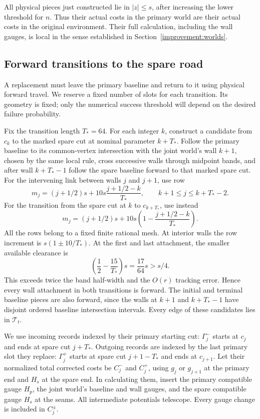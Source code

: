 All physical pieces just constructed lie in $|z|\leq s$, after
increasing the lower threshold for $n$. Thus their actual costs in
the primary world are their actual costs in the original environment.
Their full calculation, including the wall gauges, is local in the
sense established in Section~\ref{improvement:worlds}.

\subsection{Forward transitions to the spare road}
\label{improvement:transitions}

A replacement must leave the primary baseline and return to it using
physical forward travel. We reserve a fixed number of slots for each
transition. Its geometry is fixed; only the numerical success threshold
will depend on the desired failure probability.

Fix the transition length $T_*=64$. For each
integer $k$, construct a candidate from $c_k$ to the marked spare
cut at nominal parameter $k+T_*$. Follow the primary baseline to its
common-vertex intersection with the joint world's wall $k+1$, chosen
by the same local rule, cross successive
walls through midpoint bands, and after wall $k+T_*-1$ follow the
spare baseline forward to that marked spare cut. For the intervening
link between walls $j$ and $j+1$, use row
\begin{equation}
 m_j=(j+1/2)s+10s\frac{j+1/2-k}{T_*},
 \qquad k+1\leq j\leq k+T_*-2.
 \label{improvement:transitions:eq1}
\end{equation}
For the transition from the spare cut at $k$ to $c_{k+T_*}$, use instead
\begin{equation}
 m_j=(j+1/2)s+10s\left(1-\frac{j+1/2-k}{T_*}\right).
 \label{improvement:transitions:eq2}
\end{equation}
All the rows belong to a fixed finite rational mesh. At interior walls
the row increment is $s(1\pm10/T_*)$. At the first and last attachment,
the smaller available clearance is
\[
 \left(\frac12-\frac{15}{T_*}\right)s
 =\frac{17}{64}s>s/4.
\]
This exceeds twice the band half-width and the $O(r)$ tracking error.
Hence every wall attachment in both transitions is forward. The
initial and terminal baseline pieces are also forward, since the
walls at $k+1$ and $k+T_*-1$ have disjoint ordered baseline intersection
intervals. Every edge of these candidates lies in $\mathcal T_t$.

We use incoming records indexed by their primary starting cut:
$\Gamma_j^-$ starts at $c_j$ and ends at spare cut $j+T_*$. Outgoing
records are indexed by the last primary slot they replace:
$\Gamma_j^+$ starts at spare cut $j+1-T_*$ and ends at $c_{j+1}$.
Let their normalized total corrected costs be $C_j^-$ and $C_j^+$,
using $g_j$ or $g_{j+1}$ at the primary end and $H_s$ at the spare end.
In calculating them, insert the primary compatible gauge $H_p$,
the joint world's baseline and wall gauges, and the spare compatible
gauge $H_s$ at the seams. All intermediate potentials telescope.
Every gauge change is included in $C_j^\pm$.

